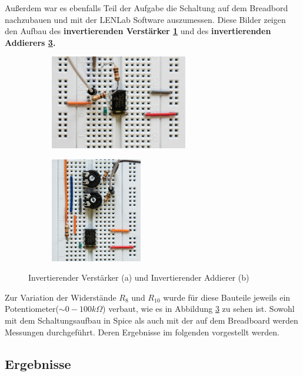 \newpage
Außerdem war es ebenfalls Teil der Aufgabe die Schaltung auf dem Breadbord nachzubauen und mit der LENLab Software auszumessen. Diese Bilder zeigen den Aufbau des \textbf{invertierenden Verstärker \ref{invV}} und des \textbf{invertierenden Addierers \ref{invA}.}

\begin{figure}[h]
\centering
\begin{subfigure}{.5\textwidth}
  \centering
  \includegraphics[width=6cm]{pics/Invertierer_aufgebaut.jpg}
  \label{invV}
\end{subfigure}%
\begin{subfigure}{.5\textwidth}
  \centering
  \includegraphics[width=4cm]{pics/Addierer_aufgebaut.jpg}
  \label{invA}
\end{subfigure}
\caption{Invertierender Verstärker (a) und Invertierender Addierer (b)}
\end{figure}

Zur Variation der Widerstände $R_{8}$ und $R_{10}$ wurde für diese Bauteile jeweils ein Potentiometer($\sim 0-100k\Omega$) verbaut, wie es in Abbildung \ref{invA} zu sehen ist.
\newline Sowohl mit dem Schaltungsaufbau in Spice als auch mit der auf dem Breadboard werden Messungen durchgeführt. Deren Ergebnisse im folgenden vorgestellt werden.

\subsection{Ergebnisse}
